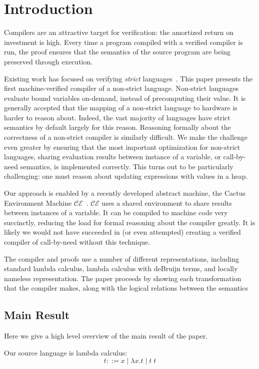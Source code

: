 \section{Introduction}
Compilers are an attractive target for verification: the amortized return on
investment is high. Every time a program compiled with a verified compiler is
run, the proof ensures that the semantics of the source program are being
preserved through execution. 

Existing work has focused on verifying \emph{strict}
languages~\cite{chlipala2007certified, leroy2012compcert}. This paper presents
the first machine-verified compiler of a non-strict language. Non-strict
languages evaluate bound variables on-demand, instead of precomputing their
value. It is generally accepted that the mapping of a non-strict language to
hardware is harder to reason about.  Indeed, the vast majority of languages
have strict semantics by default largely for this reason. Reasoning formally
about the correctness of a non-strict compiler is similarly difficult. We make
the challenge even greater by ensuring that the most important optimization for
non-strict languages, sharing evaluation results between instance of a
variable, or call-by-need semantics, is implemented correctly. This turns out
to be particularly challenging: one must reason about updating expressions with
values in a heap. 

Our approach is enabled by a recently developed abstract machine, the Cactus
Environment Machine $\mathcal{CE}$~\cite{?}. $\mathcal{CE}$ uses a shared
environment to share results between instances of a variable. It can be compiled
to machine code very succinctly, reducing the load for formal reasoning about
the compiler greatly. It is likely we would not have succeeded in (or even
attempted) creating a verified compiler of call-by-need without this technique.

The compiler and proofs use a number of different representations, including
standard lambda calculus, lambda calculus with deBruijn terms, and locally
nameless representation. The paper proceeds by showing each transformation that
the compiler makes, along with the logical relations between the semantics

\subsection{Main Result}
Here we give a high level overview of the main result of the paper.

Our source language is lambda calculus: 
$$ t ::= x \; | \; \lambda x.t \; | \; t \; t $$

